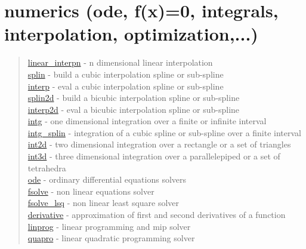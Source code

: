 \chapter*{numerics (ode, f(x)=0, integrals, interpolation,
  optimization,...)}


\begin{quote}
\noindent
\hyperlink{linear_interpn}{linear\_interpn} - n dimensional linear interpolation \\
\hyperlink{splin}{splin} - build a cubic interpolation spline or sub-spline \\
\hyperlink{interp}{interp} - eval a cubic interpolation spline or sub-spline \\
\hyperlink{splin2d}{splin2d} - build a bicubic interpolation spline or sub-spline \\
\hyperlink{interp2d}{interp2d} - eval a bicubic interpolation spline or sub-spline \\
\hyperlink{intg}{intg} - one dimensional integration over a finite or infinite interval \\
\hyperlink{intg_splin}{intg\_splin} - integration of a cubic spline or sub-spline over a finite interval \\
\hyperlink{int2d}{int2d} - two dimensional integration over a rectangle or a set of triangles \\
 \hyperlink{int3d}{int3d} - three dimensional integration over a parallelepiped  or a set of tetrahedra \\
\hyperlink{ode}{ode} - ordinary differential equations solvers \\
\hyperlink{fsolve}{fsolve} - non linear equations solver \\
\hyperlink{fsolve_lsq}{fsolve\_lsq} - non linear least square solver \\
\hyperlink{derivative}{derivative} - approximation of first and second derivatives of a function\\
\hyperlink{linprog}{linprog} - linear programming and mip solver\\
\hyperlink{quapro}{quapro} - linear quadratic programming solver \\
\end{quote}



 

  
  
 
 
 
 
 
 
 
 
 

